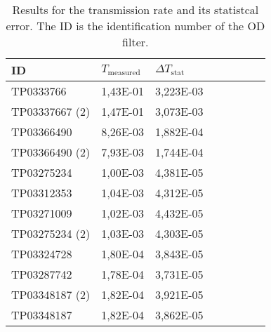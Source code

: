 

\begin{table}[!ht]
    \centering
    \begin{tabular}{|l|l|l|l|l|l|l|l|}
    \hline
        \textbf{ID}& \textbf{$T_{\text{measured}}$} & \textbf{$\Delta T_{\text{stat}}$} \\ \hline
        TP0333766 & 1,43E-01 & 3,223E-03 \\ \hline
        TP03337667 (2)  & 1,47E-01 & 3,073E-03\\ \hline
        TP03366490  & 8,26E-03 & 1,882E-04\\ \hline
        TP03366490 (2)  & 7,93E-03 & 1,744E-04 \\ \hline
        TP03275234  & 1,00E-03 & 4,381E-05 \\ \hline
        TP03312353  & 1,04E-03 & 4,312E-05 \\ \hline
        TP03271009  & 1,02E-03 & 4,432E-05 \\ \hline
        TP03275234 (2)  & 1,03E-03 & 4,303E-05 \\ \hline
        TP03324728  & 1,80E-04 & 3,843E-05\\ \hline
        TP03287742  & 1,78E-04 & 3,731E-05\\ \hline
        TP03348187 (2)  & 1,82E-04 & 3,921E-05\\ \hline
        TP03348187  & 1,82E-04 & 3,862E-05\\ \hline
    \end{tabular}
    \caption{Results for the transmission rate and its statistcal error.
    The ID is the identification number of the OD filter.}
    \label{tab: ND_filter_calibration}
\end{table}